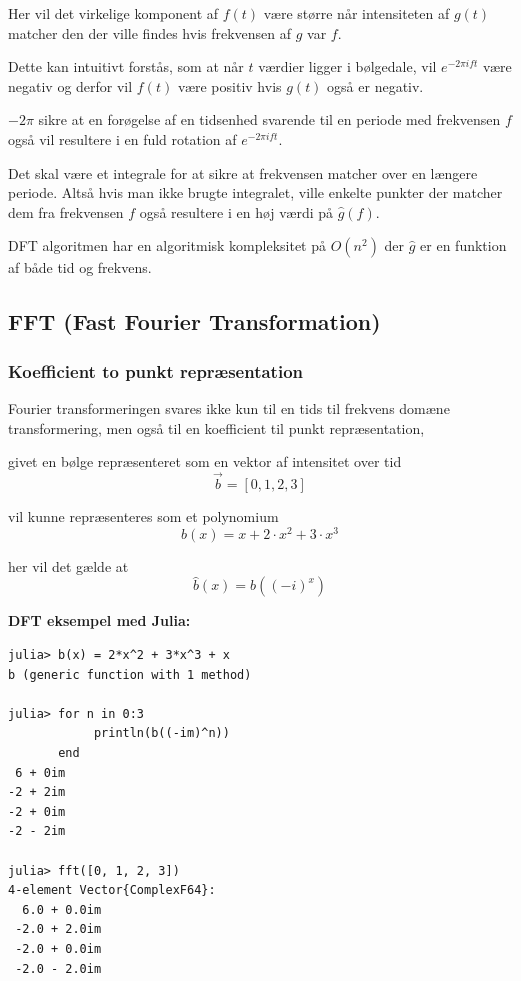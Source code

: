 \documentclass[11pt,a4paper]{article}
\begin{document}
Her vil det virkelige komponent af \(f(t)\) være større når intensiteten af \(g(t)\)
matcher den der ville findes hvis frekvensen af \(g\) var \(f\).

Dette kan intuitivt forstås, som at når \(t\) værdier ligger i bølgedale, vil \(e^{-2\pi ift}\) være negativ
og derfor vil \(f(t)\) være positiv hvis \(g(t)\) også er negativ.

\(-2\pi\) sikre at en forøgelse af en tidsenhed svarende til en periode med frekvensen \(f\) også vil resultere
i en fuld rotation af \(e^{-2\pi ift}\).

Det skal være et integrale for at sikre at frekvensen matcher over en længere periode.
Altså hvis man ikke brugte integralet,
ville enkelte punkter der matcher dem fra frekvensen \(f\) også resultere i en høj værdi på \(\hat{g}(f)\).

\bigskip

DFT algoritmen har en algoritmisk kompleksitet på \(O(n^2)\) der \(\hat{g}\) er en funktion af både tid og frekvens.

\newpage

\subsection{FFT (Fast Fourier Transformation)}
\label{sec:orgd0253a0}

\subsubsection{Koefficient to punkt repræsentation}
\label{sec:orge4eda6b}

Fourier transformeringen svares ikke kun til en tids til frekvens domæne transformering,
men også til en koefficient til punkt repræsentation,

givet en bølge repræsenteret som en vektor af intensitet over tid
$$
\vec{b} = [0, 1, 2, 3]
$$

vil kunne repræsenteres som et polynomium
$$
b(x) = x + 2\cdot x^2 + 3\cdot x^3
$$

her vil det gælde at
$$
\hat{b}(x) = b((-i)^x)
$$

\textbf{DFT eksempel med Julia:}
\begin{verbatim}
julia> b(x) = 2*x^2 + 3*x^3 + x
b (generic function with 1 method)

julia> for n in 0:3
            println(b((-im)^n))
       end
 6 + 0im
-2 + 2im
-2 + 0im
-2 - 2im

julia> fft([0, 1, 2, 3])
4-element Vector{ComplexF64}:
  6.0 + 0.0im
 -2.0 + 2.0im
 -2.0 + 0.0im
 -2.0 - 2.0im
\end{verbatim}
\end{document}
